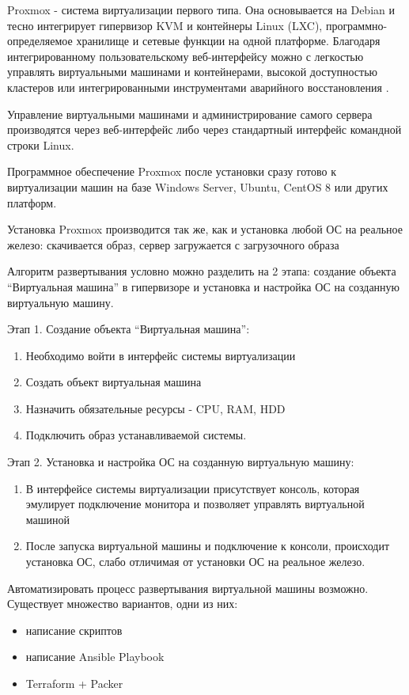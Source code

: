 Proxmox - система виртуализации первого типа. Она основывается на Debian и тесно интегрирует гипервизор KVM и контейнеры Linux (LXC), программно-определяемое хранилище и сетевые функции на одной платформе. Благодаря интегрированному пользовательскому веб-интерфейсу можно с легкостью управлять виртуальными машинами и контейнерами, высокой доступностью кластеров или интегрированными инструментами аварийного восстановления \cite{proxmox}.

Управление виртуальными машинами и администрирование самого сервера производятся через веб-интерфейс либо через стандартный интерфейс командной строки Linux. 

Программное обеспечение Proxmox после установки сразу готово к виртуализации машин на базе Windows Server, Ubuntu, CentOS 8 или других платформ.

Установка Proxmox производится так же, как и установка любой ОС на реальное железо: скачивается образ, сервер загружается с загрузочного образа


Алгоритм развертывания условно можно разделить на 2 этапа: создание объекта “Виртуальная машина” в гипервизоре и установка и настройка ОС на созданную виртуальную машину.

Этап 1. Создание объекта “Виртуальная машина”:
\begin{enumerate}
    \item Необходимо войти в интерфейс системы виртуализации
    \item Создать объект виртуальная машина
    \item Назначить обязательные ресурсы - CPU, RAM, HDD
    \item Подключить образ устанавливаемой системы.
\end{enumerate}

Этап 2. Установка и настройка ОС на созданную виртуальную машину:
\begin{enumerate}
    \item В интерфейсе системы виртуализации присутствует консоль, которая эмулирует подключение монитора и позволяет управлять виртуальной машиной
    \item После запуска виртуальной машины и подключение к консоли, происходит установка ОС, слабо отличимая от установки ОС на реальное железо.
\end{enumerate}

Автоматизировать процесс развертывания виртуальной машины возможно. Существует множество вариантов, одни из них: 
\begin{itemize}
    \item написание скриптов
    \item написание Ansible Playbook
    \item Terraform + Packer
\end{itemize}


